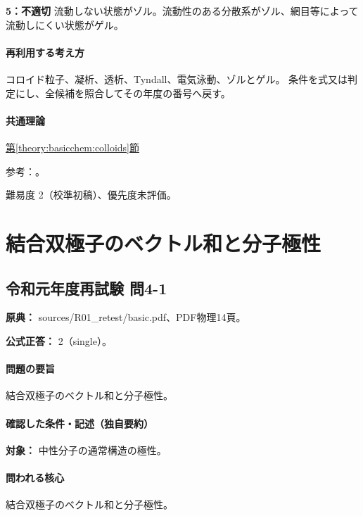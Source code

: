 \noindent\textbf{5：不適切} 流動しない状態がゾル。流動性のある分散系がゾル、網目等によって流動しにくい状態がゲル。\par

\paragraph{再利用する考え方} コロイド粒子、凝析、透析、Tyndall、電気泳動、ゾルとゲル。 条件を式又は判定にし、全候補を照合してその年度の番号へ戻す。

\paragraph{共通理論} \hyperref[theory:basicchem:colloids]{第\ref*{theory:basicchem:colloids}節}

\par 参考：\cite{openstax_colloids}。

\par 難易度 2（校準初稿）、優先度未評価。

\section{結合双極子のベクトル和と分子極性}

\subsection{令和元年度再試験 問4-1}
\label{q:r01-ret-basic-4-1}

\noindent\textbf{原典：} sources/R01\_retest/basic.pdf、PDF物理14頁。

\textbf{公式正答：} 2（single）。

\paragraph{問題の要旨} 結合双極子のベクトル和と分子極性。

\paragraph{確認した条件・記述（独自要約）}\mbox{}\par

\noindent\textbf{対象：} 中性分子の通常構造の極性。\par

\paragraph{問われる核心} 結合双極子のベクトル和と分子極性。

